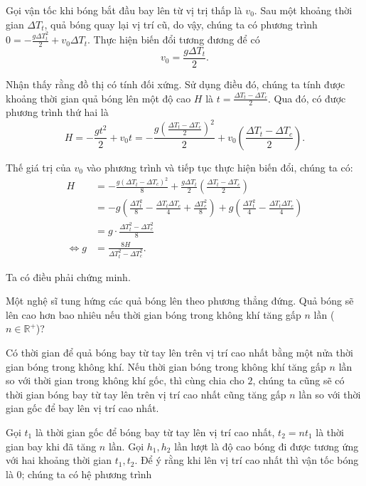 \documentclass[a4paper, titlepage, openany]{book}
\newcounter{exercise}
\newcounter{solution}
\begin{document}
\solution

Gọi vận tốc khi bóng bắt đầu bay lên từ vị trị thấp là $v_0$. Sau một khoảng thời gian $\Delta T_t$, quả bóng quay lại vị trí cũ, do vậy, chúng ta có phương trình $0 = -\frac{g \Delta T_t^2}{2} + v_0 \Delta T_t$. Thực hiện biến đổi tương đương để có $$v_0=\frac{g \Delta T_t}{2}.$$

Nhận thấy rằng đồ thị có tính đối xứng. Sử dụng điều đó, chúng ta tính được khoảng thời gian quả bóng lên một độ cao $H$ là $t=\frac{\Delta T_t-\Delta T_c}{2}$. Qua đó, có được phương trình thứ hai là $$H = -\frac{g t^2}{2} + v_0 t=-\frac{g \left(\frac{\Delta T_t-\Delta T_c}{2}\right)^2}{2} + v_0 \left(\frac{\Delta T_t-\Delta T_c}{2}\right).$$

Thế giá trị của $v_0$ vào phương trình và tiếp tục thực hiện biến đổi, chúng ta có:
\begin{align*}
   H &= -\frac{g \left(\Delta T_t-\Delta T_c\right)^2}{8} + \frac{g \Delta T_t}{2} \left(\frac{\Delta T_t-\Delta T_c}{2}\right) \\
   &= -g\left(\frac{\Delta T_t^2}{8} - \frac{\Delta T_t\Delta T_c}{4} + \frac{\Delta T_c^2}{8}\right) + g\left(\frac{\Delta T_t^2}{4} - \frac{\Delta T_t\Delta T_c}{4}\right) \\
   &= g\cdot \frac{\Delta T_t^2 - \Delta T_c^2}{8} \\
   \iff g &= \frac{8H}{\Delta T_t^2 - \Delta T_c^2}.
\end{align*}

Ta có điều phải chứng minh.

\exercise Một nghệ sĩ tung hứng các quả bóng lên theo phương thẳng đứng. Quả bóng sẽ lên cao hơn bao nhiêu nếu thời gian bóng trong không khí tăng gấp $n$ lần ($n \in \mathbb{R}^+$)?

\solution

Có thời gian để quả bóng bay từ tay lên trên vị trí cao nhất bằng một nửa thời gian bóng trong không khí. Nếu thời gian bóng trong không khí tăng gấp $n$ lần so với thời gian trong không khí gốc, thì cùng chia cho $2$, chúng ta cũng sẽ có thời gian bóng bay từ tay lên trên vị trí cao nhất cũng tăng gấp $n$ lần so với thời gian gốc để bay lên vị trí cao nhất.

Gọi $t_1$ là thời gian gốc để bóng bay từ tay lên vị trí cao nhất, $t_2 = n t_1$ là thời gian bay khi đã tăng $n$ lần. Gọi $h_1, h_2$ lần lượt là độ cao bóng đi được tương ứng với hai khoảng thời gian $t_1, t_2$. Để ý rằng khi lên vị trí cao nhất thì vận tốc bóng là $0$; chúng ta có hệ phương trình
\end{document}
